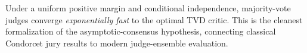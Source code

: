 \begin{remark}
Under a uniform positive margin and conditional independence, majority-vote judges
converge \emph{exponentially fast} to the optimal TVD critic. This is the
cleanest formalization of the asymptotic-consensus hypothesis, connecting
classical Condorcet jury results to modern judge-ensemble evaluation.
\end{remark}
